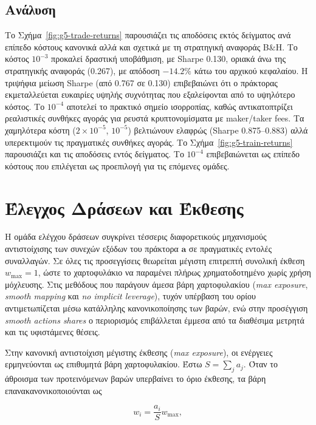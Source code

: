 \subsection{Ανάλυση}
\label{subsec:exp-fees-analysis}

Το Σχήμα~\ref{fig:g5-trade-returns} παρουσιάζει τις αποδόσεις εκτός δείγματος ανά επίπεδο κόστους κανονικά αλλά και σχετικά με τη στρατηγική αναφοράς B\&H. 
Το κόστος $10^{-3}$ προκαλεί δραστική υποβάθμιση, με Sharpe 0.130, οριακά άνω της στρατηγικής αναφοράς (0.267), με απόδοση $-14{.}2\%$ 
κάτω του αρχικού κεφαλαίου. Η τριψήφια μείωση Sharpe (από 0.767 σε 0.130) επιβεβαιώνει ότι ο πράκτορας εκμεταλλεύεται ευκαιρίες υψηλής 
συχνότητας που εξαλείφονται από το υψηλότερο κόστος. Το $10^{-4}$ αποτελεί το πρακτικό σημείο ισορροπίας, καθώς αντικατοπτρίζει ρεαλιστικές 
συνθήκες αγοράς για ρευστά κρυπτονομίσματα με maker/taker fees. Τα χαμηλότερα κόστη ($2\times10^{-5}$, $10^{-5}$) βελτιώνουν ελαφρώς 
(Sharpe 0.875--0.883) αλλά υπερεκτιμούν τις πραγματικές συνθήκες αγοράς. Το Σχήμα~\ref{fig:g5-train-returns} παρουσιάζει και τις αποδόσεις εντός δείγματος. 
Το $10^{-4}$ επιβεβαιώνεται ως επίπεδο κόστους που επιλέγεται ως προεπιλογή για τις επόμενες ομάδες.


\section{Έλεγχος Δράσεων και Έκθεσης}
\label{sec:exp-actions}

Η ομάδα ελέγχου δράσεων συγκρίνει τέσσερις διαφορετικούς μηχανισμούς αντιστοίχισης των συνεχών εξόδων του πράκτορα $\mathbf{a}$ σε πραγματικές εντολές συναλλαγών. 
Σε όλες τις προσεγγίσεις θεωρείται μέγιστη επιτρεπτή συνολική έκθεση $w_{\max}=1$, ώστε το χαρτοφυλάκιο να παραμένει 
πλήρως χρηματοδοτημένο χωρίς χρήση μόχλευσης. Στις μεθόδους που παράγουν άμεσα βάρη χαρτοφυλακίου (\textit{max exposure}, \textit{smooth mapping} 
και \textit{no implicit leverage}), τυχόν υπέρβαση του ορίου αντιμετωπίζεται μέσω κατάλληλης κανονικοποίησης των βαρών, ενώ στην 
προσέγγιση \textit{smooth actions shares} ο περιορισμός επιβάλλεται έμμεσα από τα διαθέσιμα μετρητά και τις υφιστάμενες θέσεις.

Στην κανονική αντιστοίχιση μέγιστης έκθεσης (\textit{max exposure}), οι ενέργειες ερμηνεύονται ως επιθυμητά βάρη χαρτοφυλακίου. Έστω $S=\sum_j a_j$. 
Όταν το άθροισμα των προτεινόμενων βαρών υπερβαίνει το όριο έκθεσης, τα βάρη επανακανονικοποιούνται ως

\begin{equation}
w_i=\frac{a_i}{S}w_{\max},
\end{equation}

